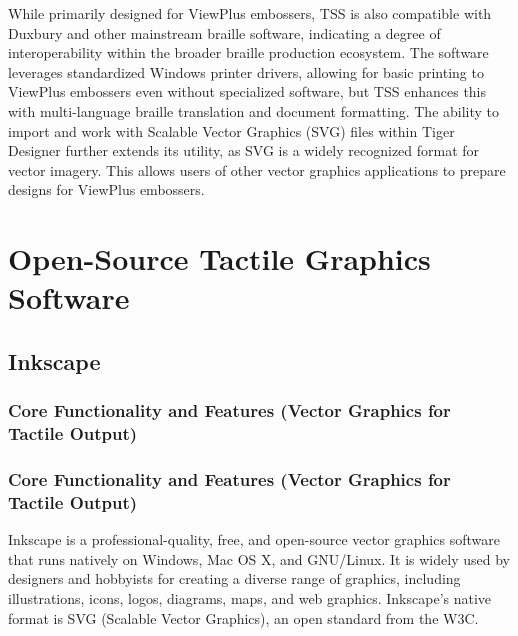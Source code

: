While primarily designed for ViewPlus embossers, TSS is also compatible with Duxbury and other mainstream braille software, indicating a degree of interoperability within the broader braille production ecosystem. \cite{EmeraldCoast,ElitaManual,DuxburyProducts,TouchMapper,SteemitInkscape} The software leverages standardized Windows printer drivers, allowing for basic printing to ViewPlus embossers even without specialized software, but TSS enhances this with multi-language braille translation and document formatting. \cite{ElitaManual} The ability to import and work with Scalable Vector Graphics (SVG) files within Tiger Designer further extends its utility, as SVG is a widely recognized format for vector imagery. \cite{ElitaManual,IrieBrailleTrac} This allows users of other vector graphics applications to prepare designs for ViewPlus embossers.

\section{Open-Source Tactile Graphics Software}

\subsection{Inkscape}

\subsubsection{Core Functionality and Features (Vector Graphics for Tactile Output)}

\subsubsection{Core Functionality and Features (Vector Graphics for Tactile Output)}

Inkscape is a professional-quality, free, and open-source vector graphics software that runs natively on Windows, Mac OS X, and GNU/Linux. \cite{GetBraille,BlindHelpDBT} It is widely used by designers and hobbyists for creating a diverse range of graphics, including illustrations, icons, logos, diagrams, maps, and web graphics. \cite{BlindHelpDBT} Inkscape's native format is SVG (Scalable Vector Graphics), an open standard from the W3C. \cite{BlindHelpDBT}

